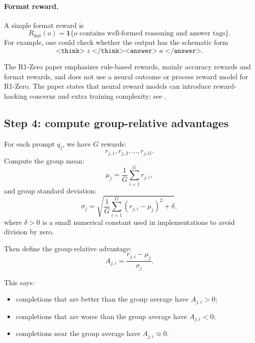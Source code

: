 \documentclass[11pt]{article}
\newcommand{\ind}{\mathbf{1}}
\newcommand{\fmt}{\mathrm{fmt}}
\begin{document}
\paragraph{Format reward.}
A simple format reward is
\begin{equation}
R_{\fmt}(o)
=\ind\{o \text{ contains well-formed reasoning and answer tags}\}.
\end{equation}
For example, one could check whether the output has the schematic form
\[
\texttt{<think>}\;z\;\texttt{</think><answer>}\;a\;\texttt{</answer>}.
\]

The R1-Zero paper emphasizes rule-based rewards, mainly accuracy rewards and format rewards, and does not use a neural outcome or process reward model for R1-Zero. The paper states that neural reward models can introduce reward-hacking concerns and extra training complexity; see \cite{guo2025r1}.

\subsection{Step 4: compute group-relative advantages}

For each prompt $q_j$, we have $G$ rewards:
\begin{equation}
 r_{j,1},r_{j,2},\ldots,r_{j,G}.
\end{equation}
Compute the group mean:
\begin{equation}
\mu_j = \frac{1}{G}\sum_{i=1}^{G} r_{j,i},
\end{equation}
and group standard deviation:
\begin{equation}
\sigma_j
=\sqrt{\frac{1}{G}\sum_{i=1}^{G}(r_{j,i}-\mu_j)^2 + \delta},
\end{equation}
where $\delta>0$ is a small numerical constant used in implementations to avoid division by zero.

Then define the group-relative advantage:
\begin{equation}
A_{j,i}
=\frac{r_{j,i}-\mu_j}{\sigma_j}.
\label{eq:advantage}
\end{equation}

This says:
\begin{itemize}[leftmargin=*]
  \item completions that are better than the group average have $A_{j,i}>0$;
  \item completions that are worse than the group average have $A_{j,i}<0$;
  \item completions near the group average have $A_{j,i}\approx 0$.
\end{itemize}
\end{document}
